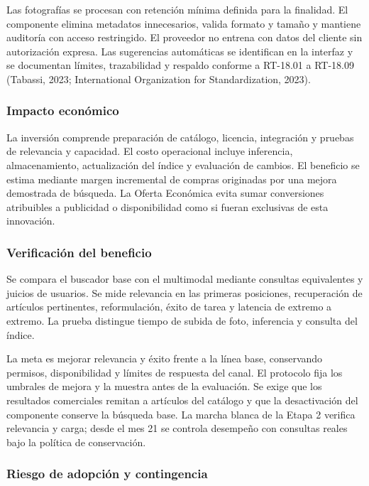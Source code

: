 \documentclass[11pt]{article}
\begin{document}
Las fotografías se procesan con retención mínima definida para la finalidad. El componente elimina metadatos innecesarios, valida formato y tamaño y mantiene auditoría con acceso restringido. El proveedor no entrena con datos del cliente sin autorización expresa. Las sugerencias automáticas se identifican en la interfaz y se documentan límites, trazabilidad y respaldo conforme a RT-18.01 a RT-18.09 (Tabassi, 2023; International Organization for Standardization, 2023).

\subsubsection{Impacto económico}\label{impacto-econuxf3mico-2}

La inversión comprende preparación de catálogo, licencia, integración y pruebas de relevancia y capacidad. El costo operacional incluye inferencia, almacenamiento, actualización del índice y evaluación de cambios. El beneficio se estima mediante margen incremental de compras originadas por una mejora demostrada de búsqueda. La Oferta Económica evita sumar conversiones atribuibles a publicidad o disponibilidad como si fueran exclusivas de esta innovación.

\subsubsection{Verificación del beneficio}\label{verificaciuxf3n-del-beneficio-2}

Se compara el buscador base con el multimodal mediante consultas equivalentes y juicios de usuarios. Se mide relevancia en las primeras posiciones, recuperación de artículos pertinentes, reformulación, éxito de tarea y latencia de extremo a extremo. La prueba distingue tiempo de subida de foto, inferencia y consulta del índice.

La meta es mejorar relevancia y éxito frente a la línea base, conservando permisos, disponibilidad y límites de respuesta del canal. El protocolo fija los umbrales de mejora y la muestra antes de la evaluación. Se exige que los resultados comerciales remitan a artículos del catálogo y que la desactivación del componente conserve la búsqueda base. La marcha blanca de la Etapa 2 verifica relevancia y carga; desde el mes 21 se controla desempeño con consultas reales bajo la política de conservación.

\subsubsection{Riesgo de adopción y contingencia}\label{riesgo-de-adopciuxf3n-y-contingencia-2}
\end{document}
